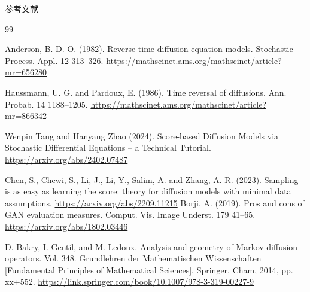 \documentclass[dvipdfmx,11pt]{beamer}
\theoremstyle{plain}
\theoremstyle{定義}
\begin{document}
    \begin{frame}[allowframebreaks]{参考文献}
    \begin{thebibliography}{99}
    
    Anderson, B. D. O. (1982).
    Reverse-time diffusion equation models.
    Stochastic Process. Appl. 12 313–326.
    \url{https://mathscinet.ams.org/mathscinet/article?mr=656280}
    
    Haussmann, U. G. and Pardoux, E. (1986).
    Time reversal of diffusions.
    Ann. Probab. 14 1188–1205.
    \url{https://mathscinet.ams.org/mathscinet/article?mr=866342}
    
    Wenpin Tang and Hanyang Zhao (2024).
    Score-based Diffusion Models via Stochastic Differential Equations -- a Technical Tutorial.
    \url{https://arxiv.org/abs/2402.07487}
    
    Chen, S., Chewi, S., Li, J., Li, Y., Salim, A. and Zhang, A. R. (2023).
    Sampling is as easy as learning the score: theory for diffusion models with minimal data assumptions.
    \url{https://arxiv.org/abs/2209.11215}
    Borji, A. (2019). Pros and cons of GAN evaluation measures. Comput.
    Vis. Image Underst. 179 41–65.
    \url{https://arxiv.org/abs/1802.03446}

    D. Bakry, I. Gentil, and M. Ledoux. Analysis and geometry of Markov diffusion operators. Vol. 348. Grundlehren der Mathematischen Wissenschaften [Fundamental Principles of Mathematical Sciences]. Springer, Cham, 2014, pp. xx+552.
    \url{https://link.springer.com/book/10.1007/978-3-319-00227-9}
    \end{thebibliography}
    \end{frame}
  
\end{document}
